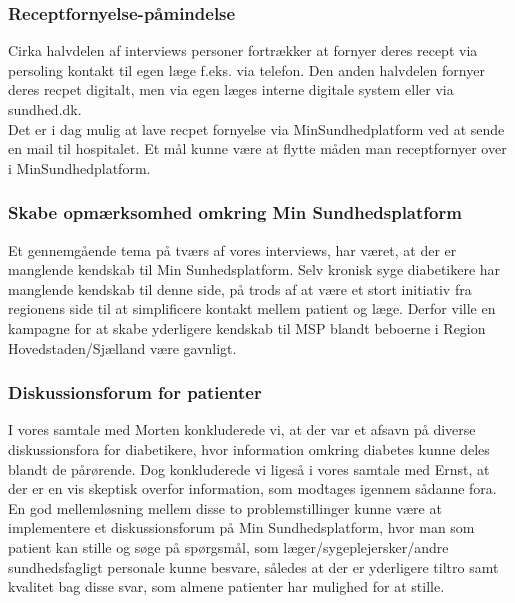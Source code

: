 \subsubsection{Receptfornyelse-påmindelse}
Cirka halvdelen af interviews personer fortrækker at fornyer deres recept via persoling kontakt til egen læge f.eks. via telefon. Den anden halvdelen fornyer deres recpet digitalt, men via egen læges interne digitale system eller via sundhed.dk. \\
Det er i dag mulig at lave recpet fornyelse via MinSundhedplatform ved at sende en mail til hospitalet. Et mål kunne være at flytte måden man receptfornyer over i MinSundhedplatform.

\subsubsection{Skabe opmærksomhed omkring Min Sundhedsplatform}
Et gennemgående tema på tværs af vores interviews, har været, at der er manglende kendskab til Min Sunhedsplatform. Selv kronisk syge diabetikere har manglende kendskab til denne side, på trods af at være et stort initiativ fra regionens side til at simplificere kontakt mellem patient og læge. Derfor ville en kampagne for at skabe yderligere kendskab til MSP blandt beboerne i Region Hovedstaden/Sjælland være gavnligt.

\subsubsection{Diskussionsforum for patienter}
I vores samtale med Morten konkluderede vi, at der var et afsavn på diverse diskussionsfora for diabetikere, hvor information omkring diabetes kunne deles blandt de pårørende.
Dog konkluderede vi ligeså i vores samtale med Ernst, at der er en vis skeptisk overfor information, som modtages igennem sådanne fora. En god mellemløsning mellem disse to problemstillinger kunne være at implementere et diskussionsforum på Min Sundhedsplatform, hvor man som patient kan stille og søge på spørgsmål, som læger/sygeplejersker/andre sundhedsfagligt personale kunne besvare, således at der er yderligere tiltro samt kvalitet bag disse svar, som almene patienter har mulighed for at stille. 
